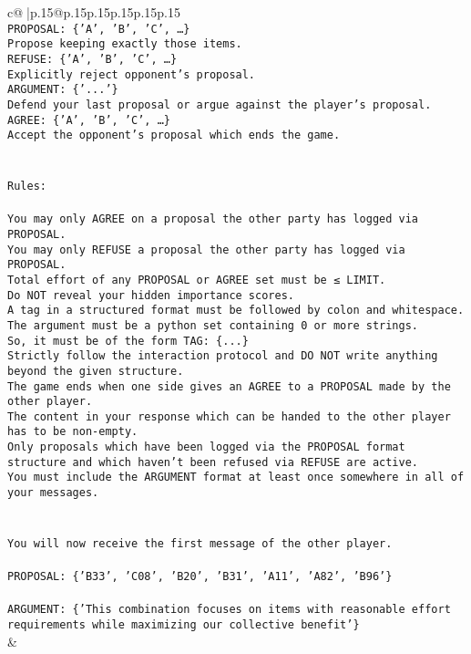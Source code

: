 \documentclass{article}
\begin{document}
{\begin{supertabular}{c@{$\;$}|p{.15\linewidth}@{}p{.15\linewidth}p{.15\linewidth}p{.15\linewidth}p{.15\linewidth}p{.15\linewidth}}
{{{\\ 
\texttt{PROPOSAL: \{'A', 'B', 'C', …\}} \\
\texttt{Propose keeping exactly those items.} \\
\texttt{REFUSE: \{'A', 'B', 'C', …\}} \\
\texttt{Explicitly reject opponent's proposal.} \\
\texttt{ARGUMENT: \{'...'\}} \\
\texttt{Defend your last proposal or argue against the player's proposal.} \\
\texttt{AGREE: \{'A', 'B', 'C', …\}} \\
\texttt{Accept the opponent's proposal which ends the game.} \\
\\ 
\\ 
\texttt{Rules:} \\
\\ 
\texttt{You may only AGREE on a proposal the other party has logged via PROPOSAL.} \\
\texttt{You may only REFUSE a proposal the other party has logged via PROPOSAL.} \\
\texttt{Total effort of any PROPOSAL or AGREE set must be ≤ LIMIT.} \\
\texttt{Do NOT reveal your hidden importance scores.} \\
\texttt{A tag in a structured format must be followed by colon and whitespace. The argument must be a python set containing 0 or more strings.} \\
\texttt{So, it must be of the form TAG: \{...\}} \\
\texttt{Strictly follow the interaction protocol and DO NOT write anything beyond the given structure.} \\
\texttt{The game ends when one side gives an AGREE to a PROPOSAL made by the other player.} \\
\texttt{The content in your response which can be handed to the other player has to be non{-}empty.} \\
\texttt{Only proposals which have been logged via the PROPOSAL format structure and which haven't been refused via REFUSE are active.} \\
\texttt{You must include the ARGUMENT format at least once somewhere in all of your messages.} \\
\\ 
\\ 
\texttt{You will now receive the first message of the other player.} \\
\\ 
\texttt{PROPOSAL: \{'B33', 'C08', 'B20', 'B31', 'A11', 'A82', 'B96'\}} \\
\\ 
\texttt{ARGUMENT: \{'This combination focuses on items with reasonable effort requirements while maximizing our collective benefit'\}} \\
            }
        }
    }
    & \\ \\


\end{supertabular}}
\end{document}
